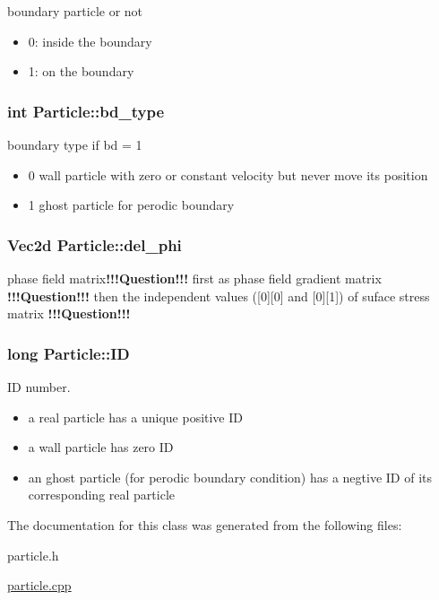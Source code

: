 boundary particle or not 

\begin{itemize}
\item 0: inside the boundary\item 1: on the boundary \end{itemize}
\hypertarget{classParticle_73728c6443f6ade479e960ef9d070221}{
\subsubsection[{bd\_\-type}]{\setlength{\rightskip}{0pt plus 5cm}int {\bf Particle::bd\_\-type}}}
\label{classParticle_73728c6443f6ade479e960ef9d070221}


boundary type if bd = 1\begin{itemize}
\item 0 wall particle with zero or constant velocity but never move its position\item 1 ghost particle for perodic boundary \end{itemize}
\hypertarget{classParticle_0461d98d796ba0e2dc72edb5b2fb093a}{
\subsubsection[{del\_\-phi}]{\setlength{\rightskip}{0pt plus 5cm}Vec2d {\bf Particle::del\_\-phi}}}
\label{classParticle_0461d98d796ba0e2dc72edb5b2fb093a}


phase field matrix{\bf !!!Question!!!} first as phase field gradient matrix {\bf !!!Question!!!} then the independent values (\mbox{[}0\mbox{]}\mbox{[}0\mbox{]} and \mbox{[}0\mbox{]}\mbox{[}1\mbox{]}) of suface stress matrix {\bf !!!Question!!!} \hypertarget{classParticle_1072ca8f2323417f321cc333d37ff1a3}{
\subsubsection[{ID}]{\setlength{\rightskip}{0pt plus 5cm}long {\bf Particle::ID}}}
\label{classParticle_1072ca8f2323417f321cc333d37ff1a3}


ID number. 

\begin{itemize}
\item a real particle has a unique positive ID\item a wall particle has zero ID\item an ghost particle (for perodic boundary condition) has a negtive ID of its corresponding real particle \end{itemize}


The documentation for this class was generated from the following files:\begin{CompactItemize}
\item 
particle.h\item 
\hyperlink{particle_8cpp}{particle.cpp}\end{CompactItemize}
